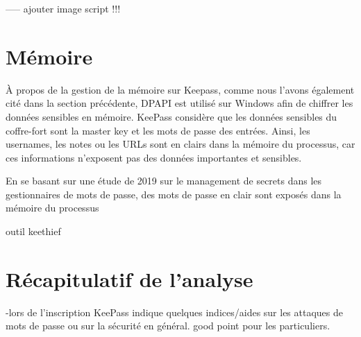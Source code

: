 {-----} ajouter image script !!!

\section{Mémoire}

À propos de la gestion de la mémoire sur Keepass\cite{kp_memory}, comme nous l'avons également cité dans la section précédente, DPAPI est utilisé sur Windows afin de chiffrer les données sensibles en mémoire. KeePass considère que les données sensibles du coffre-fort sont la master key et les mots de passe des entrées. Ainsi, les usernames, les notes ou les URLs sont en clairs dans la mémoire du processus, car ces informations n'exposent pas des données importantes et sensibles. 

En se basant sur une étude de 2019 sur le management de secrets dans les gestionnaires de mots de passe\cite{iseexploit}, des mots de passe en clair sont exposés dans la mémoire du processus

outil keethief

\section{Récapitulatif de l'analyse}
-lors de l'inscription KeePass indique quelques indices/aides sur les attaques de mots de passe ou sur la sécurité en général. good point pour les particuliers. 